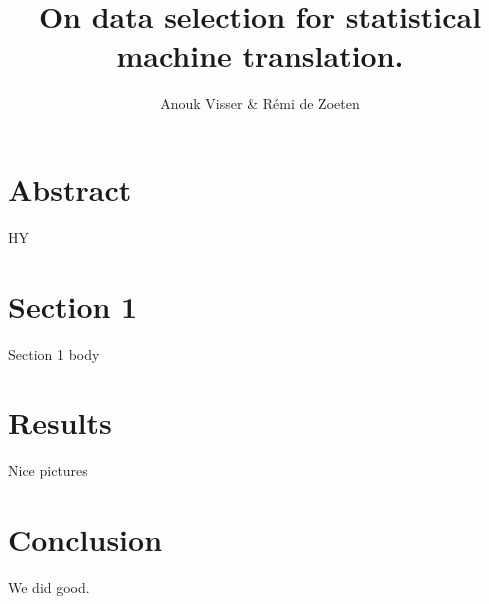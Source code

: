 \documentclass[11pt]{article}
\title{On data selection for statistical machine translation.}
\author{Anouk Visser \& R\'emi de Zoeten}
\date{}
\begin{document}
\maketitle
\newpage
\tableofcontents
\newpage

\section{Abstract}
HY

\section{Section 1}
\label{problem}
Section 1 body

\section{Results}
Nice pictures

\section{Conclusion}
We did good.


\end{document}

